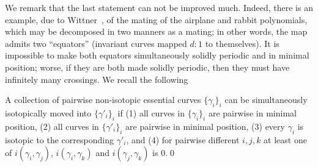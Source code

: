 \documentclass{amsart}
\begin{document}
We remark that the last statement can not be improved much. Indeed,
there is an example, due to Wittner~\cite{wittner:phd}, of the mating
of the airplane and rabbit polynomials, which may be decomposed in two
manners as a mating; in other words, the map admits two ``equators''
(invariant curves mapped $d:1$ to themselves). It is impossible to
make both equators simultaneously solidly periodic and in minimal
position; worse, if they are both made solidly periodic, then they
must have infinitely many crossings. We recall the following
\begin{lem}\label{lem:alexander}
  A collection of pairwise non-isotopic essential curves
  $\{\gamma_i\}_i$ can be simultaneously isotopically moved into
  $\{\gamma'_i\}_i$ if (1) all curves in $\{\gamma_i\}_i$ are pairwise
  in minimal position, (2) all curves in $\{\gamma'_i\}_i$ are
  pairwise in minimal position, (3) every $\gamma_i$ is isotopic to
  the corresponding $\gamma'_i$, and (4) for pairwise different
  $i,j,k$ at least one of $i(\gamma_i,\gamma_j)$,
  $i(\gamma_i,\gamma_k)$ and $i(\gamma_j,\gamma_k)$ is $0$.\qed
\end{lem}
\end{document}
